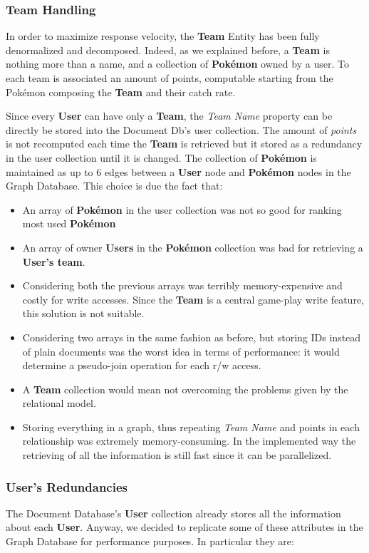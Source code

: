 \subsubsection{Team Handling}
In order to maximize response velocity, the \textbf{Team} Entity has been fully denormalized and decomposed. Indeed, as we explained before, a \textbf{Team} is nothing more than a name, and a collection of \textbf{Pokémon} owned by a user. To each team is associated an amount of points, computable starting from the Pokémon composing the \textbf{Team} and their catch rate.

Since every \textbf{User} can have only a \textbf{Team}, the \textit{Team Name} property can be directly be stored into the Document Db’s user collection. 
The amount of \textit{points} is not recomputed each time the \textbf{Team} is retrieved but it stored as a redundancy in the user collection until it is changed. 
The collection of \textbf{Pokémon} is maintained as up to 6 edges between a \textbf{User} node and \textbf{Pokémon} nodes in the Graph Database. This choice is due the fact that:
\begin{itemize}
	\item An array of \textbf{Pokémon} in the user collection was not so good for ranking most used \textbf{Pokémon}
	\item An array of owner \textbf{Users} in the \textbf{Pokémon} collection was bad for retrieving a \textbf{User’s team}.
	\item Considering both the previous arrays was terribly memory-expensive and costly for write accesses. Since the \textbf{Team} is a central game-play write feature, this solution is not suitable.
	\item Considering two arrays in the same fashion as before, but storing IDs instead of plain documents was the worst idea in terms of performance: it would determine a pseudo-join operation for each r/w access.
	\item A \textbf{Team} collection would mean not overcoming the problems given by the relational model. 
	\item Storing everything in a graph, thus repeating \textit{Team Name} and points in each relationship was extremely memory-consuming. In the implemented way the retrieving of all the information is still fast since it can be parallelized.
\end{itemize}

\subsubsection{User's Redundancies}
The Document Database’s \textbf{User} collection already stores all the information about each \textbf{User}. Anyway, we decided to replicate some of these attributes in the Graph Database for performance purposes. In particular they are:

